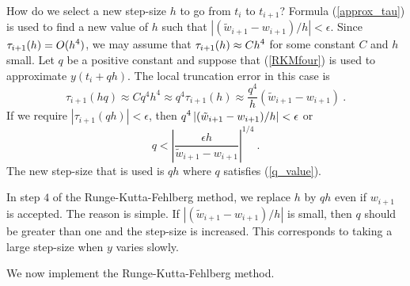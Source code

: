 \begin{rmk}
How do we select a new step-size $h$ to go from $t_i$ to $t_{i+1}$?
Formula (\ref{approx_tau}) is used to find a new value of $h$ such
that $\left|(\tilde{w}_{i+1} - w_{i+1})/h\right| < \epsilon$.
Since $\displaystyle \tau_{i+1}(h) = O(h^4)$, we may assume that
$\displaystyle \tau_{i+1}(h)\approx Ch^4$ for some constant $C$ and
$h$ small.  Let $q$ be a positive constant and suppose that
(\ref{RKMfour}) is used to approximate $y(t_i+qh)$.
The local truncation error in this case is
\[
\tau_{i+1}(hq) \approx Cq^4h^4 \approx q^4 \tau_{i+1}(h) \approx
\frac{q^4}{h}\left( \tilde{w}_{i+1} - w_{i+1} \right) \ .
\]
If we require $|\tau_{i+1}(qh)| < \epsilon$, then
$\displaystyle q^4\left| (\tilde{w}_{i+1} - w_{i+1})/h \right| < \epsilon$ or
\begin{equation} \label{q_value}
q < \left|\frac{\epsilon h}{\tilde{w}_{i+1} - w_{i+1}} \right|^{1/4} \ .
\end{equation}
The new step-size that is used is $qh$ where $q$ satisfies
(\ref{q_value}).
\end{rmk}

\begin{rmk}
In step $4$ of the Runge-Kutta-Fehlberg method, we replace
$h$ by $qh$ even
if $w_{i+1}$ is accepted.  The reason is simple.
If $\left|(\tilde{w}_{i+1}-w_{i+1})/h\right|$ is small, then $q$
should be greater than one and the step-size is increased.  This
corresponds to taking a large step-size when $y$ varies slowly.
\end{rmk}

We now implement the Runge-Kutta-Fehlberg method.

